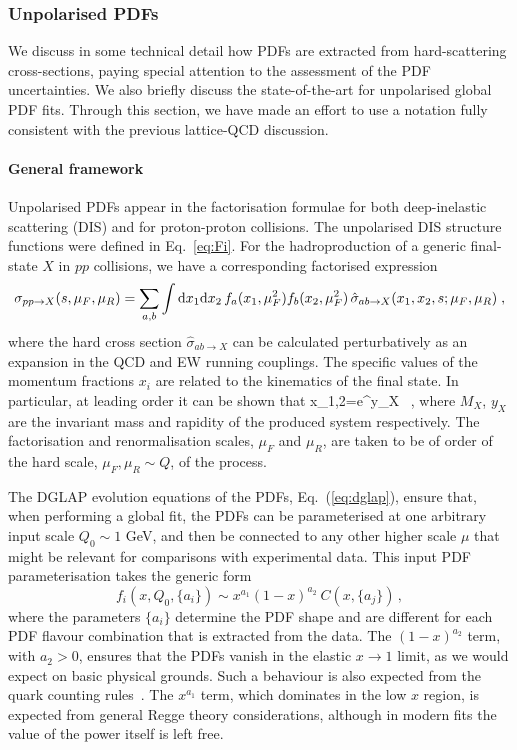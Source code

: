 \subsubsection{Unpolarised PDFs}
\label{sec:unpPDFs}

We discuss in some technical detail how PDFs are extracted
from hard-scattering cross-sections, paying special attention
to the assessment of the PDF uncertainties.
%
We also briefly discuss the state-of-the-art for unpolarised
global PDF fits.
%
Through this section,
we have made an effort to use a notation fully consistent
with the previous lattice-QCD discussion.

\paragraph{General framework}
%
Unpolarised PDFs appear in the factorisation formulae for both
deep-inelastic scattering (DIS) and for proton-proton collisions.
%
The unpolarised DIS structure functions were defined in Eq.~\eqref{eq:Fi}.
%
For the hadroproduction of a generic final-state $X$ in $pp$ collisions, we have
a corresponding factorised expression
\begin{equation}
  \label{eq:LHCxsec}
\sigma_{pp\to X}(s,\mu_F,\mu_R)=\sum_{a,b}\int {\rm d}x_1 {\rm d}x_2\, f_a(x_1,\mu_F^2)f_b(x_2,\mu_F^2)\,\hat{\sigma}_{ab\to X}(x_1,x_2,s;\mu_{F},\mu_R)\;,
\end{equation}
where the hard cross section $\hat{\sigma}_{ab\to X}$ can
be calculated perturbatively as an expansion in the QCD and EW running couplings.
%
The specific values of the momentum fractions
$x_i$ are related to the kinematics of the final state.
%
In particular, at leading order it can be shown that
\be
x_{1,2}=e^{\pm y_X} \, ,
\ee
where $M_X$, $y_X$ are the invariant mass and rapidity of the produced system respectively.
%
The factorisation and renormalisation scales, $\mu_F$ and $\mu_R$, are taken to be of order of the hard scale,
$\mu_F,\mu_R \sim Q$, of the process.

The DGLAP evolution equations of the PDFs, Eq.~(\ref{eq:dglap}), ensure that, when performing a global fit, the PDFs can be parameterised at one arbitrary input scale $Q_0\sim 1$ GeV, and
then be connected to any other higher scale $\mu$ that might be relevant
for comparisons with experimental data.
%
This input PDF parameterisation takes the generic form
\begin{equation}
\label{eq:pdffunc}
f_{i}(x,Q_0,\{a_i\})\sim x^{a_1}(1-x)^{a_2}\:C(x,\{a_j\})\, ,
\end{equation}
where the parameters $\{a_i\}$ determine the PDF shape
and are different for each PDF flavour combination that
is extracted from the data.
%
The $(1-x)^{a_2}$ term, with $a_{2}>0$, ensures that the PDFs
vanish in the elastic $x\to 1$ limit, as we would expect on basic physical grounds. 
%
Such a behaviour is also expected from the quark
counting rules~\cite{Brodsky:1973kr,Ball:2016spl}.
%
The $x^{a_1}$ term, which dominates in the low $x$
region, is expected from general Regge theory considerations,
although in modern fits the value of the power itself is left free.


